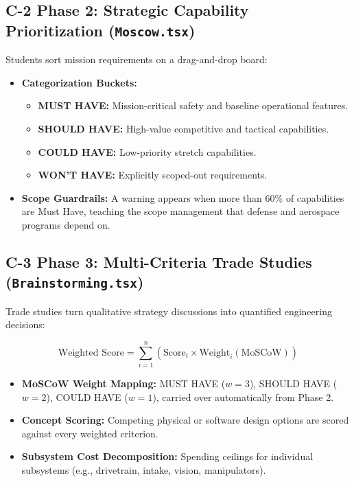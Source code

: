 \documentclass[11pt,letterpaper]{article}
\begin{document}
\subsection*{\normalsize {C-2 Phase 2: Strategic Capability Prioritization (\texttt{Moscow.tsx})}}\label{sec:C2}
Students sort mission requirements on a drag-and-drop board:

\begin{itemize}
    \item \textbf{Categorization Buckets:}
    \begin{itemize}
        \item \textbf{MUST HAVE:} Mission-critical safety and baseline operational features.
        \item \textbf{SHOULD HAVE:} High-value competitive and tactical capabilities.
        \item \textbf{COULD HAVE:} Low-priority stretch capabilities.
        \item \textbf{WON'T HAVE:} Explicitly scoped-out requirements.
    \end{itemize}
    \item \textbf{Scope Guardrails:} A warning appears when more than $60\%$ of capabilities are Must Have, teaching the scope management that defense and aerospace programs depend on.
\end{itemize}

\subsection*{\normalsize {C-3 Phase 3: Multi-Criteria Trade Studies (\texttt{Brainstorming.tsx})}}\label{sec:C3}
Trade studies turn qualitative strategy discussions into quantified engineering decisions:

\begin{equation}
\text{Weighted Score} = \sum_{i=1}^{n} \left( \text{Score}_i \times \text{Weight}_i(\text{MoSCoW}) \right)
\end{equation}

\begin{itemize}
    \item \textbf{MoSCoW Weight Mapping:} MUST HAVE ($w=3$), SHOULD HAVE ($w=2$), COULD HAVE ($w=1$), carried over automatically from Phase 2.
    \item \textbf{Concept Scoring:} Competing physical or software design options are scored against every weighted criterion.
    \item \textbf{Subsystem Cost Decomposition:} Spending ceilings for individual subsystems (e.g., drivetrain, intake, vision, manipulators).
\end{itemize}
\end{document}
